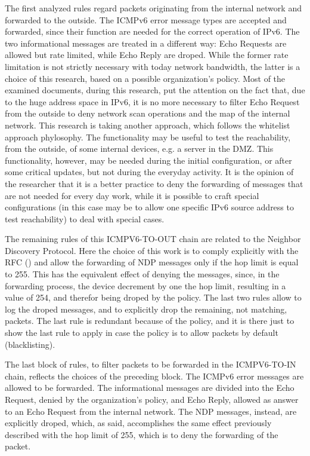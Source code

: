 \documentclass[12pt]{article}
\begin{document}
The first analyzed rules regard packets originating from the internal network and forwarded to the outside. The ICMPv6 error message types are accepted and forwarded, since their function are needed for the correct operation of IPv6. The two informational messages are treated in a different way: Echo Requests are allowed but rate limited, while Echo Reply are droped. While the former rate limitation is not strictly necessary with today network bandwidth, the latter is a choice of this research, based on a possible organization's policy. Most of the examined documents, during this research, put the attention on the fact that, due to the huge address space in IPv6, it is no more necessary to filter Echo Request from the outside to deny network scan operations and the map of the internal network. This research is taking another approach, which follows the whitelist approach phylosophy. The functionality may be useful to test the reachability, from the outside, of some internal devices, e.g. a server in the DMZ. This functionality, however, may be needed during the initial configuration, or after some critical updates, but not during the everyday activity. It is the opinion of the researcher that it is a better practice to deny the forwarding of messages that are not needed for every day work, while it is possible to craft special configurations (in this case may be to allow one specific IPv6 source address to test reachability) to deal with special cases.

The remaining rules of this ICMPV6-TO-OUT chain are related to the Neighbor Discovery Protocol. Here the choice of this work is to comply explicitly with the RFC (\cite{rfc4861}) and allow the forwarding of NDP messages only if the hop limit is equal to 255. This has the equivalent effect of denying the messages, since, in the forwarding process, the device decrement by one the hop limit, resulting in a value of 254, and therefor being droped by the policy. The last two rules allow to log the droped messages, and to explicitly drop the remaining, not matching, packets. The last rule is redundant because of the policy, and it is there just to show the last rule to apply in case the policy is to allow packets by default (blacklisting).

The last block of rules, to filter packets to be forwarded in the ICMPV6-TO-IN chain, reflects the choices of the preceding block. The ICMPv6 error messages are allowed to be forwarded. The informational messages are divided into the Echo Request, denied by the organization's policy, and Echo Reply, allowed as answer to an Echo Request from the internal network. The NDP messages, instead, are explicitly droped, which, as said, accomplishes the same effect previously described with the hop limit of 255, which is to deny the forwarding of the packet.
\end{document}
